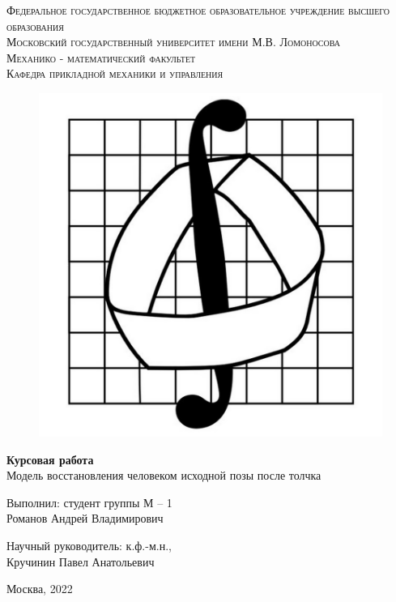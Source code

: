 \documentclass[a4paper,14pt]{article}
\theoremstyle{plain} %
\theoremstyle{definition} %
\theoremstyle{remark} %
\begin{document}
\begin{center}
    {\textsc{Федеральное государственное бюджетное образовательное
            учреждение высшего образования
        }}\\
    {\textsc{Московский государственный университет имени М.В. Ломоносова
    }} \\
    \vspace{0.2cm}
    {\textsc{Механико - математический факультет}}\\
    \vspace{0.2cm}
    {\textsc{Кафедра прикладной механики и управления}}\\
    \hfill \break
    \begin{figure}[h!]
        \centering
        \includegraphics[width=0.30\linewidth]{emblema}
        \label{fig:emblema}
    \end{figure}
    \hfill \break
    \hfill \break
    \large{\textbf{Курсовая работа}\\
        \hfill \break Модель восстановления человеком исходной позы после толчка
    }
\end{center}

\hfill \break
\hfill \break
\begin{flushright}
    {
        Выполнил: студент группы М -- 1 \\ Романов Андрей Владимирович}
\end{flushright}

\begin{flushright}
    {
        Научный руководитель: к.ф.-м.н., \\ Кручинин Павел Анатольевич}
\end{flushright}
\hfill \break
\hfill \break
\begin{center} {Москва, 2022} \end{center}
\end{document}

